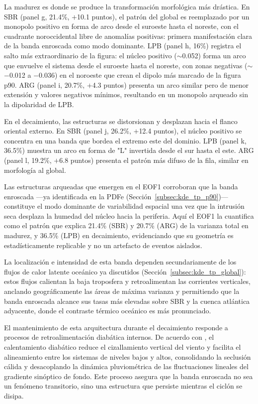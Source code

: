 La madurez es donde se produce la transformación morfológica más drástica. En SBR (panel g, 21.4\%, $+$10.1 puntos), el patrón del global es reemplazado por un monopolo positivo en forma de arco desde el suroeste hasta el noreste, con el cuadrante noroccidental libre de anomalías positivas: primera manifestación clara de la banda enroscada como modo dominante. LPB (panel h, 16\%) registra el salto más extraordinario de la figura: el núcleo positivo ($\sim$0.052) forma un arco que envuelve el sistema desde el suroeste hasta el noreste, con zonas negativas ($\sim$$-$0.012 a $-$0.036) en el noroeste que crean el dipolo más marcado de la figura p90. ARG (panel i, 20.7\%, $+$4.3 puntos) presenta un arco similar pero de menor extensión y valores negativos mínimos, resultando en un monopolo arqueado sin la dipolaridad de LPB.

En el decaimiento, las estructuras se distorsionan y desplazan hacia el flanco oriental externo. En SBR (panel j, 26.2\%, $+$12.4 puntos), el núcleo positivo se concentra en una banda que bordea el extremo este del dominio. LPB (panel k, 36.5\%) muestra un arco en forma de "L" invertida desde el sur hasta el este. ARG (panel l, 19.2\%, $+$6.8 puntos) presenta el patrón más difuso de la fila, similar en morfología al global.

Las estructuras arqueadas que emergen en el EOF1 corroboran que la banda enroscada —ya identificada en la PDFe (Sección~\ref{subsec:kde_tp_p90})— constituye el modo dominante de variabilidad espacial una vez que la intrusión seca desplaza la humedad del núcleo hacia la periferia. Aquí el EOF1 la cuantifica como el patrón que explica 21.4\% (SBR) y 20.7\% (ARG) de la varianza total en madurez, y 36.5\% (LPB) en decaimiento, evidenciando que su geometría es estadísticamente replicable y no un artefacto de eventos aislados.

La localización e intensidad de esta banda dependen secundariamente de los flujos de calor latente oceánico ya discutidos (Sección~\ref{subsec:kde_tp_global}): estos flujos calientan la baja troposfera y retroalimentan las corrientes verticales, anclando geográficamente las áreas de máxima varianza y permitiendo que la banda enroscada alcance sus tasas más elevadas sobre SBR y la cuenca atlántica adyacente, donde el contraste térmico oceánico es más pronunciado.

El mantenimiento de esta arquitectura durante el decaimiento responde a procesos de retroalimentación diabática internos. De acuerdo con \citet{reboita2022from}, el calentamiento diabático reduce el cizallamiento vertical del viento y facilita el alineamiento entre los sistemas de niveles bajos y altos, consolidando la seclusión cálida y desacoplando la dinámica pluviométrica de las fluctuaciones lineales del gradiente sinóptico de fondo. Este proceso asegura que la banda enroscada no sea un fenómeno transitorio, sino una estructura que persiste mientras el ciclón se disipa.

